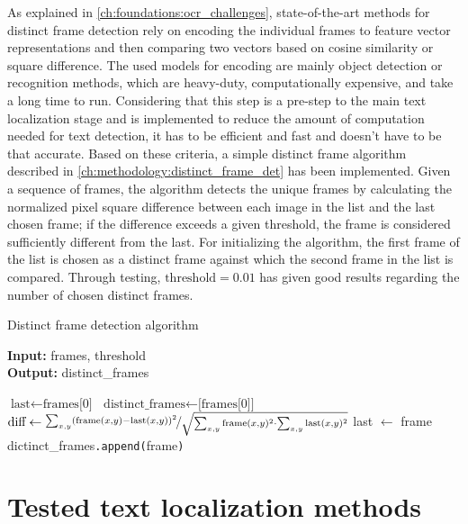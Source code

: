 As explained in \ref{ch:foundations:ocr_challenges}, state-of-the-art methods for distinct frame detection rely on encoding the individual frames to feature vector representations and then comparing two vectors based on cosine similarity or square difference. The used models for encoding are mainly object detection or recognition methods, which are heavy-duty, computationally expensive, and take a long time to run. Considering that this step is a pre-step to the main text localization stage and is implemented to reduce the amount of computation needed for text detection, it has to be efficient and fast and doesn't have to be that accurate. Based on these criteria, a simple distinct frame algorithm described in \ref{ch:methodology:distinct_frame_det} has been implemented. Given a sequence of frames, the algorithm detects the unique frames by calculating the normalized pixel square difference between each image in the list and the last chosen frame; if the difference exceeds a given threshold, the frame is considered sufficiently different from the last. For initializing the algorithm, the first frame of the list is chosen as a distinct frame against which the second frame in the list is compared. Through testing, $\text{threshold} = 0.01$ has given good results regarding the number of chosen distinct frames.

\begin{algorithm}
\caption{Distinct frame detection algorithm}\label{ch:methodology:distinct_frame_det}
\textbf{Input:} frames, threshold \\
\textbf{Output:} distinct\_frames 
\begin{algorithmic}
\State $\text{last} \gets \text{frames[0]}$
\State $\text{distinct\_frames} \gets \text{[frames[0]]}$
\State $\text{diff} \gets \nicefrac{\sum_{x,y} (\text{frame}(x,y)-\text{last}(x,y))^2}{\sqrt{\sum_{ x,y}\text{frame}(x,y)^2 \cdot \sum_{x,y} \text{last}(x,y)^2}}$
    \State last $\gets$ frame
    \State dictinct\_frames\texttt{.append(}frame\texttt{)}
\EndIf
\EndFor
\end{algorithmic}
\end{algorithm}

\section{Tested text localization methods}

